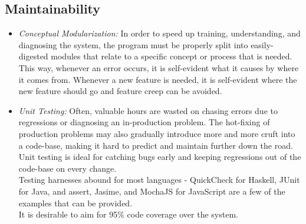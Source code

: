 \documentclass[titlepage, 12pt]{extarticle}
\begin{document}
\subsection{Maintainability}
\begin{itemize}
\item {\it Conceptual Modularization:} In order to speed up training, understanding, and diagnosing the system, the program must be properly split into easily-digested modules that relate to a specific concept or process that is needed. This way, whenever an error occurs, it is self-evident what it causes by where it comes from. Whenever a new feature is needed, it is self-evident where the new feature should go and feature creep can be avoided.
\item {\it Unit Testing:} Often, valuable hours are wasted on chasing errors due to regressions or diagnosing an in-production problem. The hot-fixing of production problems may also gradually introduce more and more cruft into a code-base, making it hard to predict and maintain further down the road. Unit testing is ideal for catching bugs early and keeping regressions out of the code-base on every change.
  \\Testing harnesses abound for most languages - QuickCheck for Haskell, JUnit for Java, and assert, Jasime, and MochaJS for JavaScript are a few of the examples that can be provided.
  \\It is desirable to aim for 95\% code coverage over the system.
\end{itemize}
\end{document}
